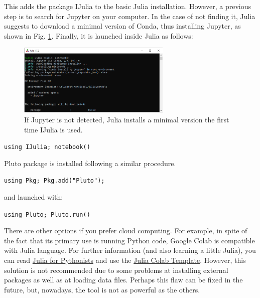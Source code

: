 This adds the package IJulia to the basic Julia installation. However, a previous step is to search for Jupyter on your computer. In the case of not finding it, Julia suggests to download a minimal version of Conda, thus installing Jupyter, as shown in Fig. \ref{Fig:Installling_Conda_with_julia}. Finally, it is launched  inside Julia as follows:
%
\begin{figure}
	\centering
	\includegraphics[width=0.65\textwidth]{fig/Julia_using_miniconda}
	\caption{If Jupyter is not detected, Julia installs a minimal version the first time IJulia is used.}
	\label{Fig:Installling_Conda_with_julia}
\end{figure}

\vspace{1mm}
	\begin{center}
		\texttt{using IJulia; notebook()} 
	\end{center}
\vspace{1mm}

Pluto package is installed following a similar procedure. 

\vspace{1mm}
\begin{center}
	\texttt{using Pkg; Pkg.add("Pluto");}
\end{center}
\vspace{1mm}

and launched with:

\vspace{1mm}
\begin{center}
	\texttt{using Pluto; Pluto.run()}
\end{center}
\vspace{1mm}

There are other options if you prefer cloud computing. For  example, in spite of the fact that its primary use is running Python code, Google Colab is compatible with Julia language. For further information (and also learning a little Julia), you can read \href{https://colab.research.google.com/github/ageron/julia_notebooks/blob/master/Julia_for_Pythonistas.ipynb#scrollTo=GIeFXS0F0zww}{Julia for Pythonists} and use the \href{https://colab.research.google.com/github/ageron/julia_notebooks/blob/master/Julia_Colab_Notebook_Template.ipynb}{Julia Colab Template}. However, this solution is not recommended due to some problems at installing external packages as well as at loading data files. Perhaps this flaw can be fixed in the future, but, nowadays, the tool is not as powerful as the others.

